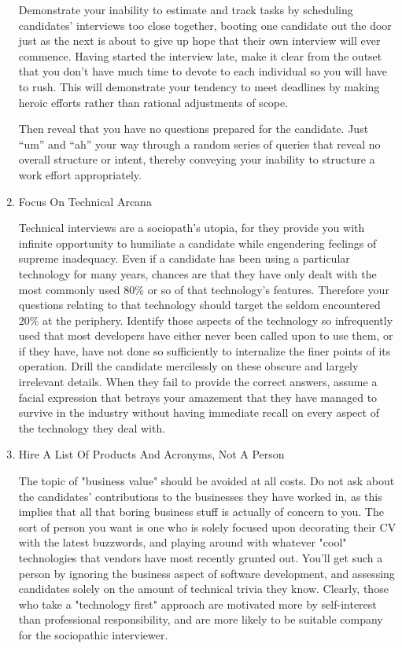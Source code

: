 \documentclass{article}
\begin{document}
\begin{enumerate}
Demonstrate your inability to estimate and track tasks by scheduling
candidates' interviews too close together, booting one candidate out the
door just as the next is about to give up hope that their own interview
will ever commence. Having started the interview late, make it clear
from the outset that you don't have much time to devote to each
individual so you will have to rush. This will demonstrate your tendency
to meet deadlines by making heroic efforts rather than rational
adjustments of scope.

Then reveal that you have no questions prepared for the candidate. Just
“um” and “ah” your way through a random series of queries that reveal no
overall structure or intent, thereby conveying your inability to
structure a work effort appropriately.

\item Focus On Technical Arcana
\label{sec:orgheadline61}

Technical interviews are a sociopath's utopia, for they provide you with
infinite opportunity to humiliate a candidate while engendering feelings
of supreme inadequacy. Even if a candidate has been using a particular
technology for many years, chances are that they have only dealt with
the most commonly used 80\% or so of that technology's features.
Therefore your questions relating to that technology should target the
seldom encountered 20\% at the periphery. Identify those aspects of the
technology so infrequently used that most developers have either never
been called upon to use them, or if they have, have not done so
sufficiently to internalize the finer points of its operation. Drill the
candidate mercilessly on these obscure and largely irrelevant details.
When they fail to provide the correct answers, assume a facial
expression that betrays your amazement that they have managed to survive
in the industry without having immediate recall on every aspect of the
technology they deal with.

\item Hire A List Of Products And Acronyms, Not A Person
\label{sec:orgheadline62}

The topic of "business value" should be avoided at all costs. Do not ask
about the candidates' contributions to the businesses they have worked
in, as this implies that all that boring business stuff is actually of
concern to you. The sort of person you want is one who is solely focused
upon decorating their CV with the latest buzzwords, and playing around
with whatever "cool" technologies that vendors have most recently
grunted out. You'll get such a person by ignoring the business aspect of
software development, and assessing candidates solely on the amount of
technical trivia they know. Clearly, those who take a "technology first"
approach are motivated more by self-interest than professional
responsibility, and are more likely to be suitable company for the
sociopathic interviewer.


\end{enumerate}
\end{document}
